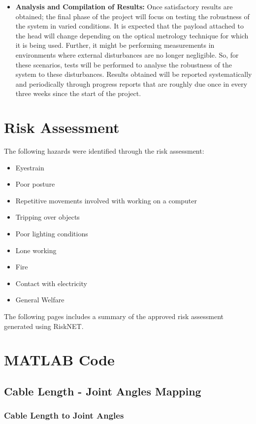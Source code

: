 \documentclass[a4paper,12pt]{report}
\begin{document}
\begin{appendices}
\begin{itemize}
		\item \textbf{Analysis and Compilation of Results:} Once satisfactory results are obtained; the final phase of the project will focus on testing the robustness of the system in varied conditions. It is expected that the payload attached to the head will change depending on the optical metrology technique for which it is being used. Further, it might be performing measurements in environments where external disturbances are no longer negligible. So, for these scenarios, tests will be performed to analyse the robustness of the system to these disturbances.
		Results obtained will be reported systematically and periodically through progress reports that are roughly due once in every three weeks since the start of the project.
	\end{itemize}
	
	
	\chapter{Risk Assessment}
	\label{appendix:b}
	The following hazards were identified through the risk assessment:
	\begin{itemize}
		\item Eyestrain
		\item Poor posture
		\item Repetitive movements involved with working on a computer
		\item Tripping over objects
		\item Poor lighting conditions
		\item Lone working
		\item Fire
		\item Contact with electricity
		\item General Welfare
	\end{itemize}
	The following pages includes a summary of the approved risk assessment generated using RiskNET.\\
	
	\chapter{MATLAB Code}
	\label{appendix:c}
	\section{Cable Length - Joint Angles Mapping}
	\label{appendix:c-a}
	\subsection{Cable Length to Joint Angles}
	

\end{appendices}
\end{document}

